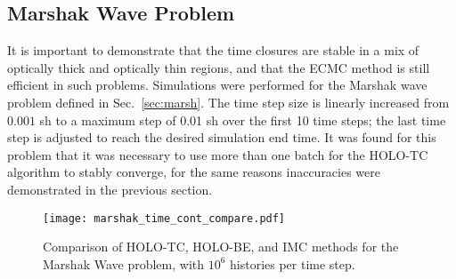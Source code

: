 \subsection{Marshak Wave Problem}

It is important to demonstrate that the time closures are stable in a mix of optically
thick and optically thin regions, and that the ECMC method is still efficient in such
problems.  Simulations were performed for the Marshak wave problem defined in
Sec.~\ref{sec:marsh}.  The time step size is linearly increased from $0.001$ sh to a
maximum step of 0.01 sh over the first 10 time steps; the last time step is adjusted to
reach the desired simulation end time.  It was found for this problem that it was
necessary to use more than one batch for the HOLO-TC algorithm to stably converge, for the
same reasons inaccuracies were demonstrated in the previous section.  
\begin{figure}[H]
    \centering
    \texttt{[image: marshak\_time\_cont\_compare.pdf]}
    \caption{\label{fig:marshak_tc} Comparison of HOLO-TC, HOLO-BE, and IMC methods for
the Marshak Wave problem, with $10^6$ histories per time step.}
\end{figure}

